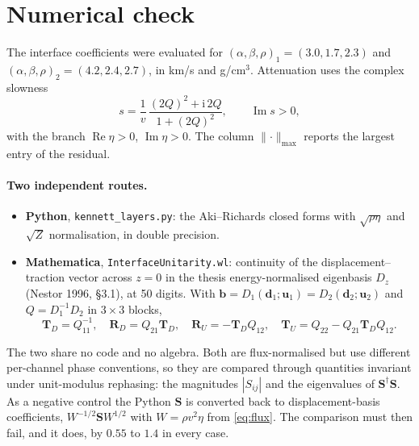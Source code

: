 \documentclass[11pt,a4paper]{article}
\newcommand{\bT}{\mathbf{T}}
\newcommand{\bS}{\mathbf{S}}
\newcommand{\bR}{\mathbf{R}}
\newcommand{\bb}{\mathbf{b}}
\newcommand{\RD}{\bR_{D}}
\newcommand{\RU}{\bR_{U}}
\newcommand{\TD}{\bT_{D}}
\newcommand{\TU}{\bT_{U}}
\newcommand{\herm}{^{\dagger}}
\begin{document}
\section{Numerical check}
\label{sec:numerics}

The interface coefficients were evaluated for
$(\alpha, \beta, \rho)_1 = (3.0, 1.7, 2.3)$ and
$(\alpha, \beta, \rho)_2 = (4.2, 2.4, 2.7)$, in km/s and g/cm$^3$.
Attenuation uses the complex slowness
\begin{equation}
  s = \frac{1}{v}\,\frac{(2Q)^2 + \mathrm{i}\,2Q}{1 + (2Q)^2},
  \qquad \operatorname{Im} s > 0,
  \label{eq:qslow}
\end{equation}
with the branch $\operatorname{Re}\eta > 0$, $\operatorname{Im}\eta >
0$. The column $\lVert\cdot\rVert_{\max}$ reports the largest entry of
the residual.

\paragraph{Two independent routes.}
\begin{itemize}
\item \textbf{Python}, \texttt{kennett\_layers.py}: the Aki--Richards
  closed forms with $\sqrt{\rho\eta}$ and $\sqrt{Z}$ normalisation,
  in double precision.
\item \textbf{Mathematica}, \texttt{InterfaceUnitarity.wl}: continuity
  of the displacement--traction vector across $z = 0$ in the thesis
  energy-normalised eigenbasis $D_z$ (Nestor 1996, \S3.1), at 50 digits.
  With $\bb = D_1(\mathbf{d}_1;\mathbf{u}_1) = D_2(\mathbf{d}_2;\mathbf{u}_2)$
  and $Q = D_1^{-1}D_2$ in $3\times3$ blocks,
  \begin{equation}
    \TD = Q_{11}^{-1},\quad \RD = Q_{21}\TD,\quad \RU = -\TD Q_{12},\quad
    \TU = Q_{22} - Q_{21}\TD Q_{12}.
    \label{eq:qblocks}
  \end{equation}
\end{itemize}
The two share no code and no algebra. Both are flux-normalised but use
different per-channel phase conventions, so they are compared through
quantities invariant under unit-modulus rephasing: the magnitudes
$|S_{ij}|$ and the eigenvalues of $\bS\herm\bS$. As a negative control
the Python $\bS$ is converted back to displacement-basis coefficients,
$W^{-1/2}\bS W^{1/2}$ with $W = \rho v^2\eta$ from \eqref{eq:flux}. The
comparison must then fail, and it does, by $0.55$ to $1.4$ in every
case.
\end{document}
